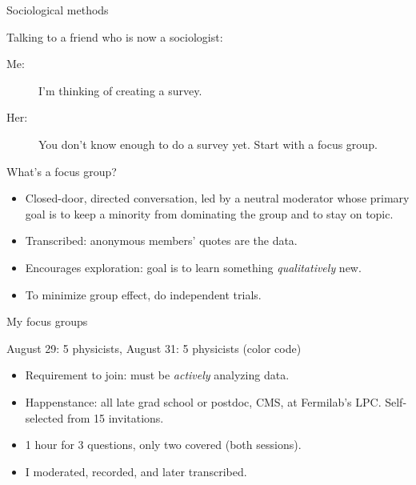 \documentclass{beamer}
\begin{document}
\begin{frame}{Sociological methods}
\vspace{0.5 cm}
\begin{block}{Talking to a friend who is now a sociologist:}
\begin{description}
\item[Me:] I'm thinking of creating a survey.

\item[Her:] You don't know enough to do a survey yet. Start with a focus group.
\end{description}
\end{block}

\begin{block}{What's a focus group?}
\begin{itemize}
\item Closed-door, directed conversation, led by a neutral moderator whose primary goal is to keep a minority from dominating the group and to stay on topic.

\item Transcribed: anonymous members' quotes are the data.

\item Encourages exploration: goal is to learn something {\it qualitatively} new.

\item To minimize group effect, do independent trials.
\end{itemize}
\end{block}
\end{frame}

\begin{frame}{My focus groups}

\textcolor{aug29}{August 29: 5 physicists}, \textcolor{aug31}{August 31: 5 physicists} (color code)

\begin{itemize}\setlength{\itemsep}{0.3 cm}
\item Requirement to join: must be {\it actively} analyzing data.
\item Happenstance: all late grad school or postdoc, CMS, at Fermilab's LPC. Self-selected from 15 invitations.

\item 1 hour for 3 questions, only two covered (both sessions).
\item I moderated, recorded, and later transcribed.
\end{itemize}
\end{frame}
\end{document}
